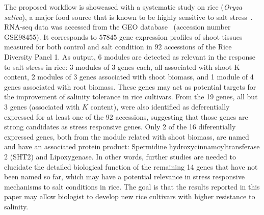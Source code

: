 The proposed workflow is showcased with a systematic study on rice
(\textit{Oryza sativa}), a major food source that is known to be
highly sensitive to salt stress~\cite{chang2019morphological}. RNA-seq
data was accessed from the GEO database~\cite{GEOAcces90:online}
(accession number GSE98455). It corresponds to $57845$ gene expression
profiles of shoot tissues measured for both control and salt condition
in $92$ accessions of the Rice Diversity Panel 1. As output, 6 modules
are detected as relevant in the response to salt stress in rice: 3
modules of 3 genes each, all associated with shoot K content, 2
modules of 3 genes associated with shoot biomass, and 1 module of 4
genes associated with root biomass. These genes may act as potential
targets for the improvement of salinity tolerance in rice
cultivars. From the 19 genes, all but 3 genes (associated with $K$
content), were also identified as deferentially expressed for at least
one of the 92 accessions, suggesting that those genes are strong
candidates as stress responsive genes. Only 2 of the 16 diferentially
expressed genes, both from the module related with shoot biomass, are
named and have an associated protein product: Spermidine
hydroxycinnamoyltransferase 2 (SHT2) and Lipoxygenase. In other words,
further studies are needed to elucidate the detailed biological
function of the remaining 14 genes that have not been named so far,
which may have a potential relevance in stress responsive mechanisms
to salt conditions in rice. The goal is that the results reported in
this paper may allow biologist to develop new rice cultivars with
higher resistance to salinity.
